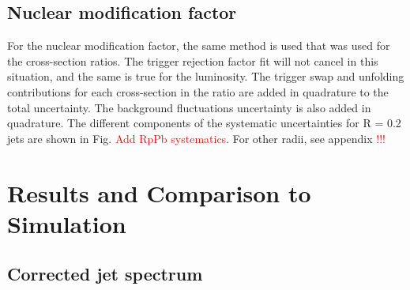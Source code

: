 \documentclass[ALICE]{ALICE_analysis_notes}
\begin{document}
\subsection{Nuclear modification factor}
\label{sec:systematicsRpA}

For the nuclear modification factor, the same method is used that was used for the cross-section ratios. The trigger rejection factor fit will not cancel in this situation, and the same is true for the luminosity. The trigger swap and unfolding contributions for each cross-section in the ratio are added in quadrature to the total uncertainty. The background fluctuations uncertainty is also added in quadrature. The different components of the systematic uncertainties for R = 0.2 jets are shown in Fig. \textcolor{red}{Add RpPb systematics}. For other radii, see appendix \textcolor{red}{!!!} %
\clearpage{}
\clearpage{}\section{Results and Comparison to Simulation}
\label{chap:results}

\subsection{Corrected jet spectrum}
\label{sec:corrJetSpectrum}
\end{document}
